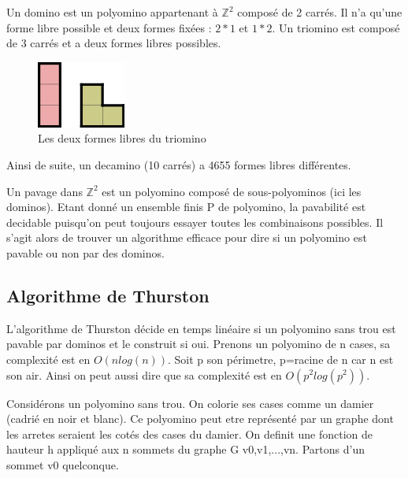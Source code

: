 \documentclass{article}
\begin{document}
\hspace{1cm}

Un domino est un polyomino appartenant à $\mathbb{Z}^{2}$ composé de 2 carrés. Il n’a qu’une forme libre possible et deux formes fixées : $2*1$ et $1*2$.
Un triomino est composé de 3 carrés et a deux formes libres possibles.

\hspace{1cm}

\begin{figure} [!h]
    \center
    \includegraphics [scale=0.5] {image/triomino.png}
    \caption{Les deux formes libres du triomino}
\end{figure}

\hspace{1cm}

Ainsi de suite, un decamino (10 carrés) a 4655 formes libres différentes.

Un pavage dans $\mathbb{Z}^{2}$ est un polyomino composé de sous-polyominos (ici les dominos).
Etant donné un ensemble finis P de polyomino, la pavabilité est decidable puisqu'on peut toujours essayer toutes les combinaisons possibles.
Il s'agit alors de trouver un algorithme efficace pour dire si un polyomino est pavable ou non par des dominos.

\newpage

\subsection{Algorithme de Thurston}

L'algorithme de Thurston décide en temps linéaire si un polyomino sans trou est pavable par dominos et le construit si oui.
Prenons un polyomino de n cases, sa complexité est en $O\left ( nlog\left ( n \right ) \right )$. Soit p son périmetre, p=racine de n car n est son air.
Ainsi on peut aussi dire que sa complexité est en $O\left ( p^{2}log\left ( p^{2} \right ) \right )$.

Considérons un polyomino sans trou. On colorie ses cases comme un damier (cadrié en noir et blanc). Ce polyomino peut etre représenté par un graphe dont les arretes seraient les cotés des cases du damier.
On definit une fonction de hauteur h appliqué aux n sommets du graphe G {v0,v1,...,vn}.
Partons d'un sommet v0 quelconque.
\end{document}
